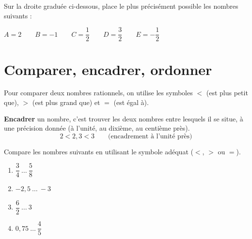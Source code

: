 \documentclass[../../syllabus_1.tex]{subfiles}
\begin{document}
\begin{itemize}
\begin{exercise}
    Sur la droite graduée ci-dessous, place le plus précisément possible les nombres suivants :
    \begin{center}
        $A = 2 \qquad B = -1 \qquad C = \dfrac{1}{2} \qquad D = \dfrac{3}{2} \qquad E = -\dfrac{1}{2}$
    \end{center}
    \begin{center}
    \end{center}
\end{exercise}
 
\newpage

\section{Comparer, encadrer, ordonner}

Pour comparer deux nombres rationnels, on utilise les symboles $<$ (est plus petit que), $>$ (est plus grand que) et $=$ (est égal à).

\textbf{Encadrer} un nombre, c'est trouver les deux nombres entre lesquels il se situe, à une précision donnée (à l'unité, au dixième, au centième près).
\begin{equation*}
    2 < 2,3 < 3 \qquad \text{(encadrement à l'unité près)}
\end{equation*}

\begin{exercise}
    Compare les nombres suivants en utilisant le symbole adéquat ($<$, $>$ ou $=$).
    \begin{enumerate}[cols=2, itemsep=1.5cm]
        \item $\dfrac{3}{4} \ \dots \ \dfrac{5}{8}$
        \item $-2{,}5 \ \dots \ -3$
        \item $\dfrac{6}{2} \ \dots \ 3$
        \item $0{,}75 \ \dots \ \dfrac{4}{5}$
    \end{enumerate}
    \vspace{1em}
\end{exercise}


\end{itemize}
\end{document}
